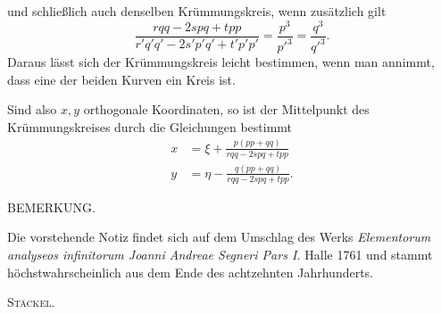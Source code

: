 %
und schließlich auch denselben Krümmungskreis, wenn zusätzlich gilt
\[
\frac{rqq-2spq+tpp}{r'q'q'-2s'p'q'+t'p'p'}=\frac{p^3}{p'^3}=\frac{q^3}{q'^3}.
\]
Daraus lässt sich der Krümmungskreis leicht bestimmen, wenn man annimmt, dass eine der beiden Kurven ein Kreis ist.

Sind also $x,y$ orthogonale Koordinaten, so ist der Mittelpunkt des Krümmungskreises durch die Gleichungen bestimmt
\[
\begin{aligned}
x&=\xi+\frac{p(pp+qq)}{rqq-2spq+tpp}\\[5pt]
y&=\eta-\frac{q(pp+qq)}{rqq-2spq+tpp}.
\end{aligned}
\]
\begin{center}BEMERKUNG.\end{center}

Die vorstehende Notiz findet sich auf dem Umschlag des Werks \textit{Elementorum analyseos infinitorum Joanni Andreae Segneri Pars I.} Halle 1761 und stammt höchstwahrscheinlich aus dem Ende des achtzehnten Jahrhunderts.\par\nobreak\hfill\textsc{Stäckel.}\par
